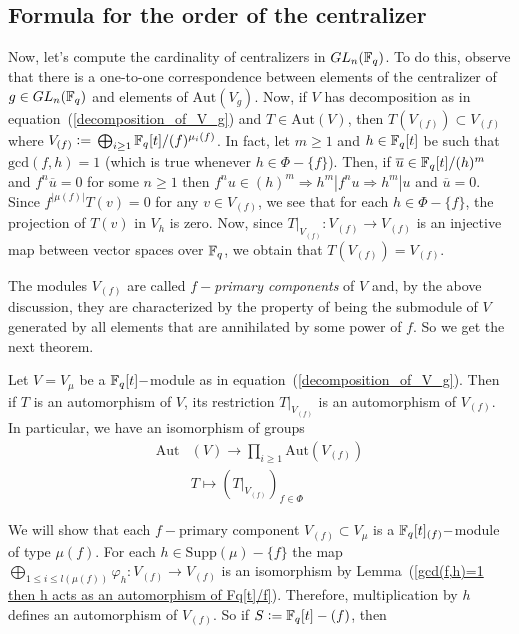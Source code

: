 \subsection{Formula for the order of the centralizer}
Now, let's compute the cardinality of centralizers in $GL_n(\mathbb{F}_q)$. To do this, observe that there is a one-to-one correspondence between elements of the centralizer of $g\in GL_n(\mathbb{F}_q)$ and elements of $\text{Aut}(V_g)$. Now, if $V$ has decomposition as in equation~(\ref{decomposition_of_V_g}) and $T\in\text{Aut}(V)$, then $T(V_{(f)})\subset V_{(f)}$ where $V_{(f)}\bydef \bigoplus_{i\geq1}\bb{F}_q[t]/(f)^{\mu_i(f)}$. In fact, let $m\geq1$ and $h\in\mathbb{F}_q[t]$ be such that $\text{gcd}(f,h)=1$ (which is true whenever $h\in\Phi-\{f\}$). Then, if $\overline{u}\in \mathbb{F}_q[t]/(h)^m$ and $f^n\overline{u}=0$ for some $n\geq1$ then $f^nu\in (h)^m\Rightarrow h^m|f^nu\Rightarrow h^m|u$ and $\overline{u}=0$. Since $f^{|\mu(f)|}T(v)=0$ for any $v\in V_{(f)}$, we see that for each $h\in\Phi-\{f\}$, the projection of $T(v)$ in $V_{h}$ is zero. Now, since $T|_{V_{(f)}}:V_{(f)}\rightarrow V_{(f)}$ is an injective map between vector spaces over $\mathbb{F}_q$, we obtain that $T(V_{(f)})=V_{(f)}$.\par
The modules $V_{(f)}$ are called $f-$\textit{primary components} of $V$ and, by the above discussion, they are characterized by the property of being the submodule of $V$ generated by all elements that are annihilated by some power of $f$. So we get the next theorem.
\begin{dang}
    \begin{theorem}\cite{macdonald1998symmetric}\label{automorphisms_restricts_to_primary_components}
    Let $V=V_\mu$ be a $\mathbb{F}_q[t]-$module as in equation~(\ref{decomposition_of_V_g}). Then if $T$ is an automorphism of $V$, its restriction $T|_{V_{(f)}}$ is an automorphism of $V_{(f)}$.  In particular, we have an isomorphism of groups 
    \begin{equation}
    \begin{split}
         \text{Aut}&(V)\rightarrow \prod_{i\geq1}\text{Aut}(V_{(f)})\\
         &T\longmapsto \left(T|_{V_{(f)}}\right)_{f\in\Phi}
    \end{split}  
    \end{equation}
    \end{theorem}
\end{dang}
We will show that each $f-$primary component $V_{(f)}\subset V_\mu$ is a $\mathbb{F}_q[t]_{(f)}-$module of type $\mu(f)$. For each $h\in\text{Supp}(\mu)-\{f\}$ the map $\bigoplus_{1\leq i\leq l(\mu(f))}\varphi_h:V_{(f)}\rightarrow V_{(f)}$ is an isomorphism by Lemma~(\ref{gcd(f,h)=1 then h acts as an automorphism of Fq[t]/f}). Therefore, multiplication by $h$ defines an automorphism of $V_{(f)}$. So if $ S\bydef \fq[t]-(f)$, then
